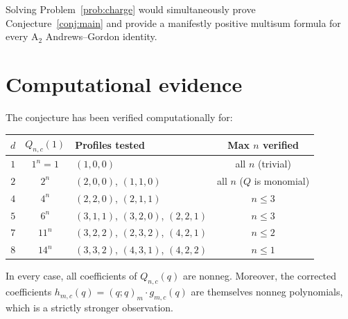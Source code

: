 \documentclass[11pt]{article}
\theoremstyle{plain}
\theoremstyle{definition}
\newcommand{\qpochn}[3]{(#1;#2)_{#3}}
\begin{document}
Solving Problem~\ref{prob:charge} would simultaneously prove
Conjecture~\ref{conj:main} and provide a manifestly positive
multisum formula for every $\mathrm{A}_2$ Andrews--Gordon identity.


\section{Computational evidence}
\label{sec:evidence}

The conjecture has been verified computationally for:
\begin{center}
\begin{tabular}{c|c|l|c}
$d$ & $Q_{n,c}(1)$ & Profiles tested & Max $n$ verified \\ \hline
$1$ & $1^n = 1$ & $(1,0,0)$ & all $n$ (trivial) \\
$2$ & $2^n$ & $(2,0,0)$, $(1,1,0)$ & all $n$ ($Q$ is monomial) \\
$4$ & $4^n$ & $(2,2,0)$, $(2,1,1)$ & $n \leq 3$ \\
$5$ & $6^n$ & $(3,1,1)$, $(3,2,0)$, $(2,2,1)$ & $n \leq 3$ \\
$7$ & $11^n$ & $(3,2,2)$, $(2,3,2)$, $(4,2,1)$ & $n \leq 2$ \\
$8$ & $14^n$ & $(3,3,2)$, $(4,3,1)$, $(4,2,2)$ & $n \leq 1$ \\
\end{tabular}
\end{center}

In every case, all coefficients of $Q_{n,c}(q)$ are nonneg.
Moreover, the corrected coefficients $h_{m,c}(q) = \qpochn{q}{q}{m} \cdot g_{m,c}(q)$
are themselves nonneg polynomials, which is a strictly stronger observation.
\end{document}
